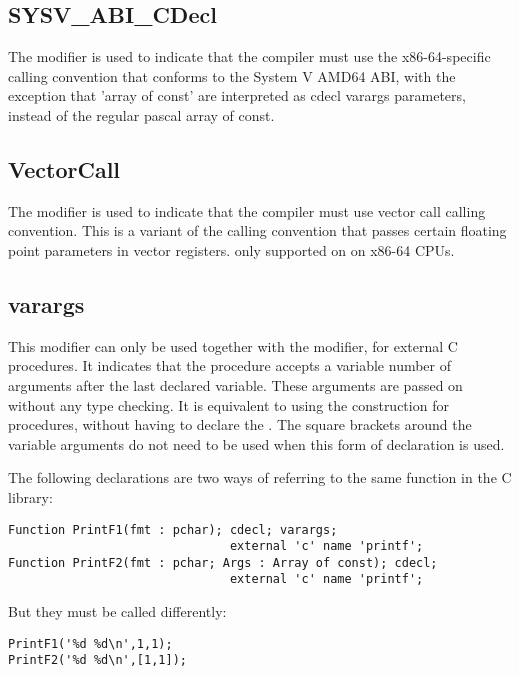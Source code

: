 \subsection{SYSV\_ABI\_CDecl}
The  modifier is used to indicate that the compiler must
use the x86-64-specific calling convention that conforms to the System V AMD64
ABI, with the exception that 'array of const' are interpreted as cdecl varargs parameters,
instead of the regular pascal array of const.

\subsection{VectorCall}
The  modifier is used to indicate that the compiler must
use vector call calling convention. This is a variant of the
 calling convention that passes certain
floating point parameters in vector registers. only supported on
on x86-64 CPUs.

\subsection{varargs}
This modifier can only be used together with the  modifier, for
external C procedures. It indicates that the procedure accepts a variable
number of arguments after the last declared variable. These arguments are
passed on without any type checking. It is equivalent to using the
 construction for  procedures, without having
to declare the . The square brackets around the variable
arguments do not need to be used when this form of declaration is used.

The following declarations are two ways of referring to the same function
in the C library:
\begin{verbatim}
Function PrintF1(fmt : pchar); cdecl; varargs;
                               external 'c' name 'printf';
Function PrintF2(fmt : pchar; Args : Array of const); cdecl;
                               external 'c' name 'printf';
\end{verbatim}
But they must be called differently:
\begin{verbatim}
PrintF1('%d %d\n',1,1);
PrintF2('%d %d\n',[1,1]);
\end{verbatim}

